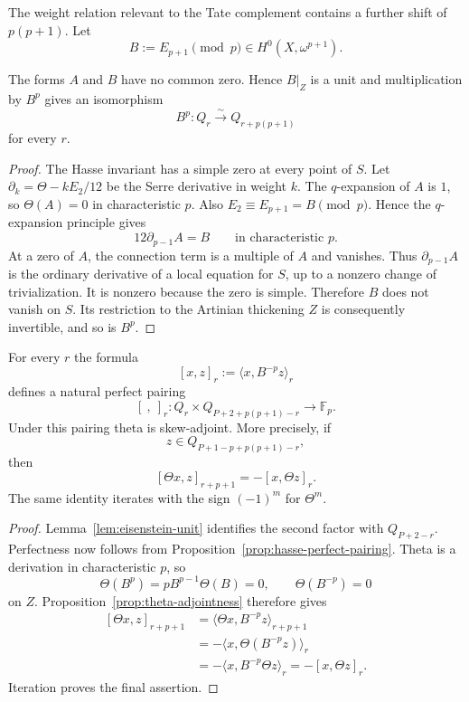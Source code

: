 The weight relation relevant to the Tate complement contains a further
shift of $p(p+1)$.  Let
\[
 B:=E_{p+1}\pmod p\in H^0(X,\omega^{p+1}).
\]

\begin{lemma}
\label{lem:eisenstein-unit}
The forms $A$ and $B$ have no common zero.  Hence $B\vert_Z$ is a unit and
multiplication by $B^p$ gives an isomorphism
\[
 B^p:Q_r\xrightarrow{\ \sim\ }Q_{r+p(p+1)}
\]
for every $r$.
\end{lemma}

\begin{proof}
The Hasse invariant has a simple zero at every point of $S$.  Let
$\partial_k=\Theta-kE_2/12$ be the Serre derivative in weight $k$.  The
$q$-expansion of $A$ is $1$, so $\Theta(A)=0$ in characteristic $p$.
Also $E_2\equiv E_{p+1}=B\pmod p$.  Hence the $q$-expansion principle gives
\[
 12\partial_{p-1}A=B
 \qquad\text{in characteristic }p.
\]
At a zero of $A$, the connection term is a multiple of $A$ and vanishes.
Thus $\partial_{p-1}A$ is the ordinary derivative of a local equation for
$S$, up to a nonzero change of trivialization.  It is nonzero because the
zero is simple.  Therefore $B$ does not vanish on $S$.  Its restriction to
the Artinian thickening $Z$ is consequently invertible, and so is $B^p$.
\end{proof}

\begin{theorem}
\label{thm:tate-complement-pairing}
For every $r$ the formula
\[
 [x,z]_r:=\langle x,B^{-p}z\rangle_r
\]
defines a natural perfect pairing
\[
 [\ ,\ ]_r:
 Q_r\times Q_{P+2+p(p+1)-r}\longrightarrow\mathbb F_p.
\]
Under this pairing theta is skew-adjoint.  More precisely, if
\[
 z\in Q_{P+1-p+p(p+1)-r},
\]
then
\[
 [\Theta x,z]_{r+p+1}=-[x,\Theta z]_r.
\]
The same identity iterates with the sign $(-1)^m$ for $\Theta^m$.
\end{theorem}

\begin{proof}
Lemma~\ref{lem:eisenstein-unit} identifies the second factor with
$Q_{P+2-r}$.  Perfectness now follows from
Proposition~\ref{prop:hasse-perfect-pairing}.  Theta is a derivation in
characteristic $p$, so
\[
 \Theta(B^p)=pB^{p-1}\Theta(B)=0,
 \qquad
 \Theta(B^{-p})=0
\]
on $Z$.  Proposition~\ref{prop:theta-adjointness} therefore gives
\[
 \begin{aligned}
 {}[\Theta x,z]_{r+p+1}
 &=\langle\Theta x,B^{-p}z\rangle_{r+p+1}\\
 &=-\langle x,\Theta(B^{-p}z)\rangle_r\\
 &=-\langle x,B^{-p}\Theta z\rangle_r
 =-[x,\Theta z]_r.
 \end{aligned}
\]
Iteration proves the final assertion.
\end{proof}

